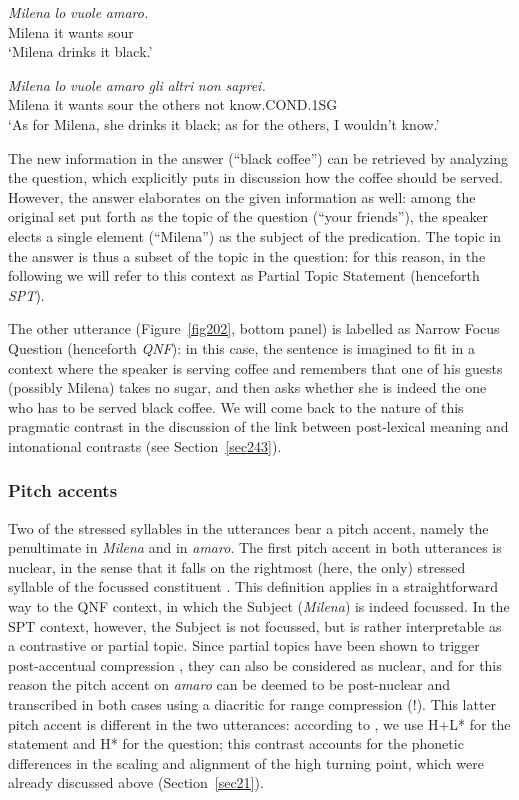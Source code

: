 \ea
\gll \textit{Milena} \textit{lo} \textit{vuole} \textit{amaro.}\\
Milena it wants sour\\
\glt ‘Milena drinks it black.’
\z

\ea
\gll \textit{Milena} \textit{lo} \textit{vuole} \textit{amaro} \textit{gli} \textit{altri} \textit{non} \textit{saprei.}\\
Milena it wants sour the others not know.COND.1SG\\
\glt ‘As for Milena, she drinks it black; as for the others, I wouldn't know.’
\z

The new information in the answer (``black coffee'') can be retrieved by analyzing the question, which explicitly puts in discussion how the coffee should be served. However, the answer elaborates on the given information as well: among the original set put forth as the topic of the question (``your friends''), the speaker elects a single element (``Milena'') as the subject of the predication. The topic in the answer is thus a subset of the topic in the question: for this reason, in the following we will refer to this context as Partial Topic Statement (henceforth \textit{SPT}). 

The other utterance (Figure~\ref{fig202}, bottom panel) is labelled as Narrow Focus Question (henceforth \textit{QNF}): in this case, the sentence is imagined to fit in a context where the speaker is serving coffee and remembers that one of his guests (possibly Milena) takes no sugar, and then asks whether she is indeed the one who has to be served black coffee. We will come back to the nature of this pragmatic contrast in the discussion of the link between post-lexical meaning and intonational contrasts (see Section~\ref{sec243}).

\subsubsection{Pitch accents}\label{sec2122}
Two of the stressed syllables in the utterances bear a pitch accent, namely the penultimate in \textit{Milena} and in \textit{amaro}. The first pitch accent in both utterances is nuclear, in the sense that it falls on the rightmost (here, the only) stressed syllable of the focussed constituent \cite[380]{grice2005strategy}. This definition applies in a straightforward way to the QNF context, in which the Subject (\textit{Milena}) is indeed focussed. In the SPT context, however, the Subject is not focussed, but is rather interpretable as a contrastive or partial topic. Since partial topics have been shown to trigger post-accentual compression \citep{dimperio2011phrasing}, they can also be considered as nuclear, and for this reason the pitch accent on \textit{amaro} can be deemed to be post-nuclear and transcribed in both cases using a diacritic for range compression (!). This latter pitch accent is different in the two utterances: according to \citet{grice2005strategy}, we use H+L* for the statement and H* for the question; this contrast accounts for the phonetic differences in the scaling and alignment of the high turning point, which were already discussed above (Section~\ref{sec21}). 

